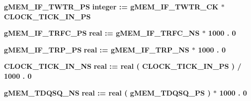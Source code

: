 \begin{DoxyCompactItemize}
\item 
{\bf g\+M\+E\+M\+\_\+\+I\+F\+\_\+\+T\+W\+T\+R\+\_\+\+PS} {\bfseries \textcolor{comment}{integer}\textcolor{vhdlchar}{ }\textcolor{vhdlchar}{ }\textcolor{vhdlchar}{\+:}\textcolor{vhdlchar}{=}\textcolor{vhdlchar}{ }\textcolor{vhdlchar}{ }\textcolor{vhdlchar}{ }\textcolor{vhdlchar}{ }{\bfseries {\bf g\+M\+E\+M\+\_\+\+I\+F\+\_\+\+T\+W\+T\+R\+\_\+\+CK}} \textcolor{vhdlchar}{$\ast$}\textcolor{vhdlchar}{ }\textcolor{vhdlchar}{ }\textcolor{vhdlchar}{ }{\bfseries {\bf C\+L\+O\+C\+K\+\_\+\+T\+I\+C\+K\+\_\+\+I\+N\+\_\+\+PS}} \textcolor{vhdlchar}{ }} 
\item 
{\bf g\+M\+E\+M\+\_\+\+I\+F\+\_\+\+T\+R\+F\+C\+\_\+\+PS} {\bfseries \textcolor{comment}{real}\textcolor{vhdlchar}{ }\textcolor{vhdlchar}{ }\textcolor{vhdlchar}{\+:}\textcolor{vhdlchar}{=}\textcolor{vhdlchar}{ }\textcolor{vhdlchar}{ }\textcolor{vhdlchar}{ }\textcolor{vhdlchar}{ }{\bfseries {\bf g\+M\+E\+M\+\_\+\+I\+F\+\_\+\+T\+R\+F\+C\+\_\+\+NS}} \textcolor{vhdlchar}{$\ast$}\textcolor{vhdlchar}{ } \textcolor{vhdldigit}{1000} \textcolor{vhdlchar}{.} \textcolor{vhdldigit}{0} \textcolor{vhdlchar}{ }} 
\item 
{\bf g\+M\+E\+M\+\_\+\+I\+F\+\_\+\+T\+R\+P\+\_\+\+PS} {\bfseries \textcolor{comment}{real}\textcolor{vhdlchar}{ }\textcolor{vhdlchar}{ }\textcolor{vhdlchar}{\+:}\textcolor{vhdlchar}{=}\textcolor{vhdlchar}{ }\textcolor{vhdlchar}{ }\textcolor{vhdlchar}{ }\textcolor{vhdlchar}{ }{\bfseries {\bf g\+M\+E\+M\+\_\+\+I\+F\+\_\+\+T\+R\+P\+\_\+\+NS}} \textcolor{vhdlchar}{$\ast$}\textcolor{vhdlchar}{ } \textcolor{vhdldigit}{1000} \textcolor{vhdlchar}{.} \textcolor{vhdldigit}{0} \textcolor{vhdlchar}{ }} 
\item 
{\bf C\+L\+O\+C\+K\+\_\+\+T\+I\+C\+K\+\_\+\+I\+N\+\_\+\+NS} {\bfseries \textcolor{comment}{real}\textcolor{vhdlchar}{ }\textcolor{vhdlchar}{ }\textcolor{vhdlchar}{\+:}\textcolor{vhdlchar}{=}\textcolor{vhdlchar}{ }\textcolor{vhdlchar}{ }\textcolor{vhdlchar}{ }\textcolor{vhdlchar}{ }\textcolor{comment}{real}\textcolor{vhdlchar}{ }\textcolor{vhdlchar}{(}\textcolor{vhdlchar}{ }{\bfseries {\bf C\+L\+O\+C\+K\+\_\+\+T\+I\+C\+K\+\_\+\+I\+N\+\_\+\+PS}} \textcolor{vhdlchar}{ }\textcolor{vhdlchar}{ }\textcolor{vhdlchar}{)}\textcolor{vhdlchar}{ }\textcolor{vhdlchar}{/}\textcolor{vhdlchar}{ } \textcolor{vhdldigit}{1000} \textcolor{vhdlchar}{.} \textcolor{vhdldigit}{0} \textcolor{vhdlchar}{ }} 
\item 
{\bf g\+M\+E\+M\+\_\+\+T\+D\+Q\+S\+Q\+\_\+\+NS} {\bfseries \textcolor{comment}{real}\textcolor{vhdlchar}{ }\textcolor{vhdlchar}{ }\textcolor{vhdlchar}{\+:}\textcolor{vhdlchar}{=}\textcolor{vhdlchar}{ }\textcolor{vhdlchar}{ }\textcolor{vhdlchar}{ }\textcolor{vhdlchar}{ }\textcolor{comment}{real}\textcolor{vhdlchar}{ }\textcolor{vhdlchar}{(}\textcolor{vhdlchar}{ }{\bfseries {\bf g\+M\+E\+M\+\_\+\+T\+D\+Q\+S\+Q\+\_\+\+PS}} \textcolor{vhdlchar}{ }\textcolor{vhdlchar}{ }\textcolor{vhdlchar}{)}\textcolor{vhdlchar}{ }\textcolor{vhdlchar}{$\ast$}\textcolor{vhdlchar}{ } \textcolor{vhdldigit}{1000} \textcolor{vhdlchar}{.} \textcolor{vhdldigit}{0} \textcolor{vhdlchar}{ }} 

\end{DoxyCompactItemize}
